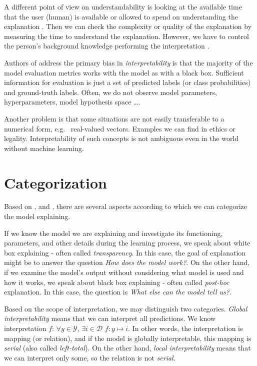 A different point of view on understandability is looking at the available time that the user (human) is available or allowed to spend on understanding the explanation \cite{Guidotti2018}. Then we can check the complexity or quality of the explanation by measuring the time to understand the explanation. However, we have to control the person's background knowledge performing the interpretation \cite{Guidotti2018}.

Authors of \cite{Montavon2018} address the primary bias in \emph{interpretability} is that the majority of the model evaluation metrics works with the model as with a black box. Sufficient information for evaluation is just a set of predicted labels (or class probabilities) and ground-truth labels. Often, we do not observe model parameters, hyperparameters, model hypothesis space \dots. 

Another problem is that some situations are not easily transferable to a numerical form, e.g. \ real-valued vectors. Examples we can find in ethics or legality. Interpretability of such concepts is not ambiguous even in the world without machine learning.

\section{Categorization}
Based on \cite{Guidotti2018}, and \cite{Lipton2016}, there are several aspects according to which we can categorize the model explaining.

If we know the model we are explaining and investigate its functioning, parameters, and other details during the learning process, we speak about white box explaining - often called \emph{transparency}. In this case, the goal of explanation might be to answer the question \emph{How does the model work?}. On the other hand, if we examine the model's output without considering what model is used and how it works, we speak about black box explaining - often called \emph{post-hoc} explanation. In this case, the question is \emph{What else can the model tell us?}.

Based on the scope of interpretation, we may distinguish two categories. \emph{Global interpretability} means that we can interpret all predictions. We know interpretation $f$: $\forall y \in \mathcal{Y}$, $\exists i \in \mathcal{D}$ $f: y\mapsto i$. In other words, the interpretation is mapping (or relation), and if the model is globally interpretable, this mapping is \emph{serial} (also called \emph{left-total}). On the other hand, \emph{local interpretability} means that we can interpret only some, so the relation is not \emph{serial}.

